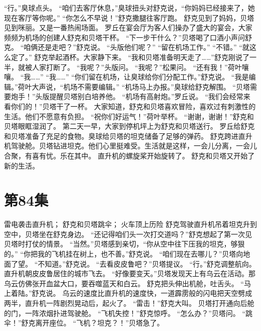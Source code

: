\documentclass[a4paper,12pt,UTF8,twoside]{ctexbook}
\begin{document}
        “行。”臭球点头。 
        “咱们去客厅休息，”臭球扭头对舒克说，“你妈妈已经接来了，她现在客厅等你呢。” 
        “你怎么不早说！”舒克撒腿往客厅跑。 
        舒克见到了妈妈，贝塔见到咪丽。又是一番热闹场面。 
        罗丘在宴会厅为客人们操办了盛大的宴会，大家频频为机场的创建人舒克和贝塔干杯。 
        “下一步干什么？”贝塔喝了口酒小声问舒克。 
        “咱俩还是走吧？”舒克说。 
        “头版他们呢？” 
        “留在机场工作。” 
        “不错。” 
        “就这么定了。” 
        舒克举起酒杯。大家静下来。 
        “我和贝塔准备明天走了……”舒克刚说了一半，就被人家打断了。 
        “我呢？”头版问。 
        “我呢？”松果问。 
        “还有我！”荷叶嚷嚷。 
        “我……” 
        “我……” 
        “你们留在机场，让臭球给你们分配工作。”舒克说。 
        “我是编辑。”荷叶大声说，“机场不需要编辑。” 
        “机场马上办报。”臭球给舒克解围。 
        “贝塔需要炮手！”头版提醒贝塔别白培养他。 
        “机场有高射炮。”罗丘说。 
        “我们会经常来看你们的！”贝塔干了一杯。 
        大家知道，舒克和贝塔喜欢冒险，喜欢过有刺激性的生活。他们不愿意有负担。 
        “祝你们好运气！”荷叶举杯。 
        “谢谢，谢谢！”舒克和贝塔眼眶湿润了。 
        第二天一早，大家到停机坪上为舒克和贝塔送行。 
        罗丘给舒克和贝塔准备了充足的食物。臭球给贝塔的坦克储备了足够的弹药。 
        舒克跨进直升机驾驶舱。贝塔钻进坦克。他们心里挺难受。生活就是这样，一会儿分离，一会儿合聚，有喜有忧。乐在其中。 
        直升机的螺旋桨开始旋转了。 
        舒克和贝塔又开始了新的生活。   \chapter{第84集} 
        雷电袭击直升机； 
        舒克和贝塔跳伞； 
        火车顶上历险   
        舒克驾驶直升机吊着坦克升到空中，贝塔坐在舒克身边。 
        “还记得咱们头一次打交道吗？”舒克想起了第一次见贝塔时打仗的情景。 
        “当然。”贝塔感到亲切，“你从空中往下压我的坦克，够狠的。” 
        “你把我的飞机挂在树上，也不善。”舒克说。 
        “咱们现在去哪儿？”贝塔向地面了望。 
        “不知道。”舒克说。 
        “去看皮皮鲁吧？”贝塔提议。 
        “行。”舒克调整航向。 
        直升机朝皮皮鲁居住的城市飞去。 
        “好像要变天。”贝塔发现天上有乌云在活动。那乌云仿佛张开血盆大口，要吞噬蓝天和白云。 
        舒克把头伸出机舱，吐舌头。 
        “马上着陆。”舒克说。 
        乌云的速度比直升机的速度快，一道霹雳般的闪电把天空劈成两半，直升机一阵剧烈晃动后，起火了。 
        “雷击！”舒克大叫。 
        贝塔打开通向后舱的门，一阵浓烟扑进驾驶舱。 
        “飞机失控！”舒克惊呼。 
        “怎么办？”贝塔问。 
        “跳伞！”舒克离开座位。 
        “飞机？坦克？！''贝塔急了。 
\end{document}

